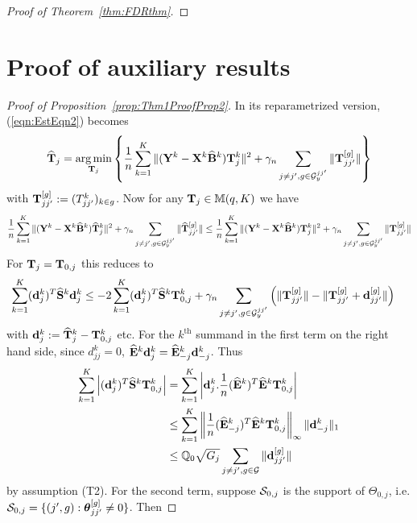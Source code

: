\documentclass[12pt, letterpaper]{article}
\DeclareMathOperator*{\argmin}{arg\,min}
\numberwithin{equation}{section}
\begin{document}
\begin{proof}[Proof of Theorem~\ref{thm:FDRthm}]

\end{proof}

\section{Proof of auxiliary results}
\begin{proof}[Proof of Proposition~\ref{prop:Thm1ProofProp2}]
In its reparametrized version, (\ref{eqn:EstEqn2}) becomes
%
\begin{align}
\widehat \bfT_j = \argmin_{\bfT_j} \left\{ \frac{1}{n} \sum_{k=1}^K \| (\bfY^k - \bfX^k \widehat \bfB^k) \bfT_j^k \|^2 + \gamma_n \sum_{j \neq j', g \in \cG_y^{jj'}} \| \bfT_{jj'}^{[g]} \| \right\}
\end{align}
%
with ${\mathbf{T}}_{jj'}^{[g]} := (T_{jj'}^k)_{k \in g}$. Now for any ${\mathbf{T}}_j \in {\mathbb{M}}(q, K)$ we have
%
$$
\frac{1}{n} \sum_{k=1}^K \| ({\mathbf{Y}}^k - {\mathbf{X}}^k \widehat {{\mathbf{B}}}^k) \widehat {{\mathbf{T}}}_j^k \|^2 + \gamma_n \sum_{j \neq j', g \in {\cal{G}}_y^{jj'}} \| \widehat {{\mathbf{T}}}_{jj'}^{[g]} \| \leq
\frac{1}{n} \sum_{k=1}^K \| ({\mathbf{Y}}^k - {\mathbf{X}}^k \widehat {{\mathbf{B}}}^k) {\mathbf{T}}_j^k \|^2 + \gamma_n \sum_{j \neq j', g \in {\cal{G}}_y^{jj'}} \| {\mathbf{T}}_{jj'}^{[g]} \|
$$
%
For ${\mathbf{T}}_j = {\mathbf{T}}_{0,j}$ this reduces to
%
\begin{align}\label{eqn::Thm1ProofProp2Eqn1}
\sum_{k=1}^K ({\bf{d}}_j^k)^T \widehat {{\mathbf{S}}}^k {\bf{d}}_j^k & \leq - 2 \sum_{k=1}^K ({\bf{d}}_j^k)^T \widehat {{\mathbf{S}}}^k {\mathbf{T}}_{0,j}^k + \gamma_n \sum_{j \neq j', g \in {\cal{G}}_y^{jj'}} \left( \| {\mathbf{T}}_{jj'}^{[g]} \| -  \| {\mathbf{T}}_{jj'}^{[g]} + {\bf{d}}_{jj'}^{[g]}\| \right)
\end{align}
%
with ${\bf{d}}_{j}^k := \widehat {{\mathbf{T}}}_j^k - {\mathbf{T}}_{0,j}^k$ etc. For the $k^\text{th}$ summand in the first term on the right hand side, since $d_{jj}^k = 0$, $\widehat {{\mathbf{E}}}^k {\bf{d}}_j^k = \widehat {{\mathbf{E}}}_{-j}^k {\bf{d}}_{-j}^k$. Thus
%
\begin{align*}
\sum_{k=1}^K \left| ({\bf{d}}_j^k)^T \widehat {{\mathbf{S}}}^k {\mathbf{T}}_{0,j}^k \right| &=
\sum_{k=1}^K \left| {\bf{d}}_j^k. \frac{1}{n} (\widehat {{\mathbf{E}}}^k)^T \widehat {{\mathbf{E}}}^k {\mathbf{T}}_{0,j}^k \right| \\
& \leq \sum_{k=1}^K \left\| \frac{1}{n} (\widehat {{\mathbf{E}}}_{-j}^k)^T \widehat {{\mathbf{E}}}^k {\mathbf{T}}_{0,j}^k \right\|_\infty \| {\bf{d}}_{-j}^k \|_1 \\
& \leq {\mathbb{Q}}_0 \sqrt {G_j} \sum_{j \neq j', g \in {\cal{G}}} \| {\bf{d}}_{jj'}^{[g]} \|
\end{align*}
%
by assumption (T2). For the second term, suppose ${\cal{S}}_{0,j}$ is the support of $\Theta_{0,j}$, i.e. ${\cal{S}}_{0,j} = \{ (j',g): {\boldsymbol{\theta}}_{jj'}^{[g]} \neq 0 \}$. Then

\end{proof}
\end{document}
